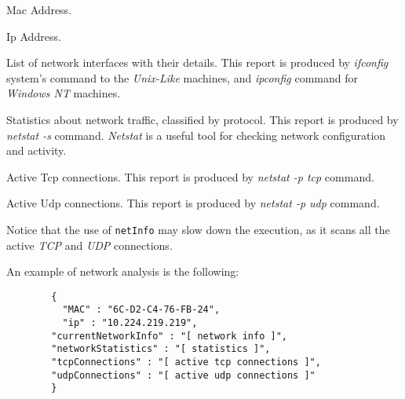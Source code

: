 \begin{description}
  \setlength\itemsep{1em}
  \item [Mac] Mac Address.
  \item [Ip] Ip Address.
  \item [CurrentNetworkInfo] List of network interfaces with their details. This report is produced by \textit{ifconfig} system's command to the \textit{Unix-Like} machines, and \textit{ipconfig} command for \textit{Windows NT} machines.
  \item [NetworkStatistics] Statistics about network traffic, classified by protocol. This report is produced by \textit{netstat -s} command. \textit{Netstat} is a useful tool for checking network configuration and activity.
  \item [TcpConnections] Active Tcp connections. This report is produced by \textit{netstat -p tcp} command.
  \item [UdpConnections] Active Udp connections. This report is produced by \textit{netstat -p udp} command.
 \end{description}

Notice that the use of \texttt{netInfo} may slow down the execution, as it scans all the active \textit{TCP} and \textit{UDP} connections.

An example of network analysis is the following:

\begin{description}
	\item 
		\begin{verbatim}
		{
		  "MAC" : "6C-D2-C4-76-FB-24",
		  "ip" : "10.224.219.219",
	 	"currentNetworkInfo" : "[ network info ]",
	 	"networkStatistics" : "[ statistics ]",
	 	"tcpConnections" : "[ active tcp connections ]",
	 	"udpConnections" : "[ active udp connections ]"
		}
	\end{verbatim}
\end{description}